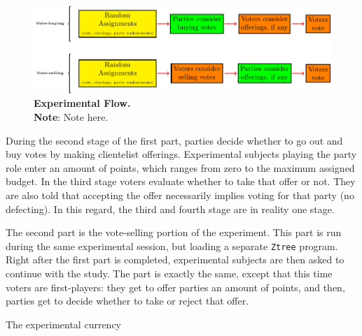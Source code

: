 \documentclass[onesided]{article}\usepackage[]{graphicx}\usepackage[]{color}
\begin{document}
\begin{figure}[H]
\includegraphics[scale=.7, center]{Experimental_Flow_Figure.pdf}
\caption{{\bf Experimental Flow.\label{experimental:design:fig}}\\\hspace{\textwidth} {\bf Note}: Note here.}\centering
\end{figure}




During the second stage of the first part, parties decide whether to go out and buy votes by making clientelist offerings. Experimental subjects playing the party role enter an amount of points, which ranges from zero to the maximum assigned budget.  In the third stage voters evaluate whether to take that offer or not. They are also told that accepting the offer necessarily implies voting for that party (no defecting). In this regard, the third and fourth stage are in reality one stage.

The second part is the vote-selling portion of the experiment. This part is run during the same experimental session, but loading a separate \texttt{Ztree} program. Right after the first part is completed, experimental subjects are then asked to continue with the study. The part is exactly the same, except that this time voters are first-players: they get to offer parties an amount of points, and then, parties get to decide whether to take or reject that offer. 

The experimental currency 











\clearpage
\newpage
{}
\setcounter{page}{1}
\printbibliography
\clearpage
\newpage



\clearpage
\newpage
{}
\end{document}
